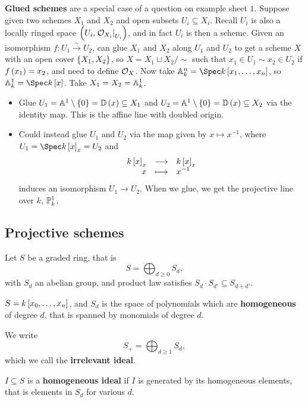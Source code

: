 \begin{example*}
\textbf{Glued schemes} are a special case of a question on example sheet $ 1 $. Suppose given two schemes $ X_1 $ and $ X_2 $ and open subsets $ U_i \subseteq X_i $. Recall $ U_i $ is also a locally ringed space $ \br{U_i, \eval{\OOO_{X_i}}_{U_i}} $, and in fact $ U_i $ is then a scheme. Given an isomorphism $ f : U_1 \xrightarrow{\sim} U_2 $, can glue $ X_1 $ and $ X_2 $ along $ U_1 $ and $ U_2 $ to get a scheme $ X $ with an open cover $ \cbr{X_1, X_2} $, so $ X = X_1 \sqcup X_2 / \sim $ such that $ x_1 \in U_1 \sim x_2 \in U_2 $ if $ f\br{x_1} = x_2 $, and need to define $ \OOO_X $. Now take $ \AA_k^n = \Spec k\sbr{x_1, \dots, x_n} $, so $ \AA_k^1 = \Spec k\sbr{x} $. Take $ X_1 = X_2 = \AA_k^1 $.
\begin{itemize}
\item Glue $ U_1 = \AA^1 \setminus \cbr{0} = \DD\br{x} \subseteq X_1 $ and $ U_2 = \AA^1 \setminus \cbr{0} = \DD\br{x} \subseteq X_2 $ via the identity map. This is the affine line with doubled origin.
\item Could instead glue $ U_1 $ and $ U_2 $ via the map given by $ x \mapsto x^{-1} $, where $ U_1 = \Spec k\sbr{x}_x = U_2 $ and
$$ \function{k\sbr{x}_x}{k\sbr{x}_x}{x}{x^{-1}} $$
induces an isomorphism $ U_1 \to U_2 $. When we glue, we get the projective line over $ k $, $ \PP_k^1 $.
\end{itemize}
\end{example*}

\subsection{Projective schemes}

Let $ S $ be a graded ring, that is
$$ S = \bigoplus_{d \ge 0} S_d, $$
with $ S_d $ an abelian group, and product law satisfies $ S_d \cdot S_{d'} \subseteq S_{d + d'} $.

\begin{example*}
$ S = k\sbr{x_0, \dots, x_n} $, and $ S_d $ is the space of polynomials which are \textbf{homogeneous} of degree $ d $, that is spanned by monomials of degree $ d $.
\end{example*}

We write
$$ S_+ = \bigoplus_{d \ge 1} S_d, $$
which we call the \textbf{irrelevant ideal}.

\begin{definition*}
$ I \subseteq S $ is a \textbf{homogeneous ideal} if $ I $ is generated by its homogeneous elements, that is elements in $ S_d $ for various $ d $.
\end{definition*}


